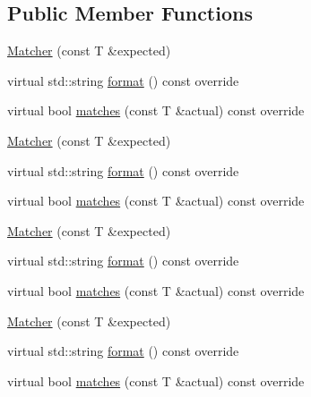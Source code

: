 \subsection*{Public Member Functions}
\begin{DoxyCompactItemize}
\item 
\mbox{\hyperlink{structfakeit_1_1internal_1_1EqMatcherCreator_1_1Matcher_a5187a06117250944e20993b6b5d9c34b}{Matcher}} (const T \&expected)
\item 
virtual std\+::string \mbox{\hyperlink{structfakeit_1_1internal_1_1EqMatcherCreator_1_1Matcher_a6f34118ff7fea46a8d934cb90885c42f}{format}} () const override
\item 
virtual bool \mbox{\hyperlink{structfakeit_1_1internal_1_1EqMatcherCreator_1_1Matcher_a777fef5dafff87f2e8cb7a0201a9bc78}{matches}} (const T \&actual) const override
\item 
\mbox{\hyperlink{structfakeit_1_1internal_1_1EqMatcherCreator_1_1Matcher_a5187a06117250944e20993b6b5d9c34b}{Matcher}} (const T \&expected)
\item 
virtual std\+::string \mbox{\hyperlink{structfakeit_1_1internal_1_1EqMatcherCreator_1_1Matcher_a6f34118ff7fea46a8d934cb90885c42f}{format}} () const override
\item 
virtual bool \mbox{\hyperlink{structfakeit_1_1internal_1_1EqMatcherCreator_1_1Matcher_a777fef5dafff87f2e8cb7a0201a9bc78}{matches}} (const T \&actual) const override
\item 
\mbox{\hyperlink{structfakeit_1_1internal_1_1EqMatcherCreator_1_1Matcher_a5187a06117250944e20993b6b5d9c34b}{Matcher}} (const T \&expected)
\item 
virtual std\+::string \mbox{\hyperlink{structfakeit_1_1internal_1_1EqMatcherCreator_1_1Matcher_a6f34118ff7fea46a8d934cb90885c42f}{format}} () const override
\item 
virtual bool \mbox{\hyperlink{structfakeit_1_1internal_1_1EqMatcherCreator_1_1Matcher_a777fef5dafff87f2e8cb7a0201a9bc78}{matches}} (const T \&actual) const override
\item 
\mbox{\hyperlink{structfakeit_1_1internal_1_1EqMatcherCreator_1_1Matcher_a5187a06117250944e20993b6b5d9c34b}{Matcher}} (const T \&expected)
\item 
virtual std\+::string \mbox{\hyperlink{structfakeit_1_1internal_1_1EqMatcherCreator_1_1Matcher_a6f34118ff7fea46a8d934cb90885c42f}{format}} () const override
\item 
virtual bool \mbox{\hyperlink{structfakeit_1_1internal_1_1EqMatcherCreator_1_1Matcher_a777fef5dafff87f2e8cb7a0201a9bc78}{matches}} (const T \&actual) const override

\end{DoxyCompactItemize}
